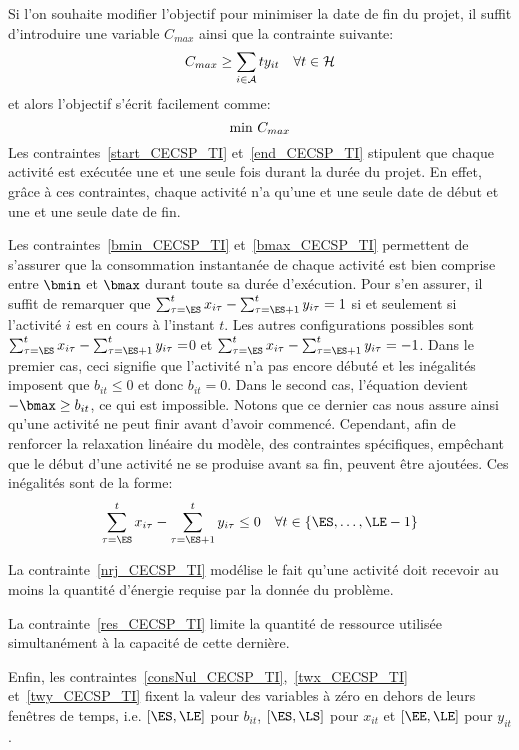 Si l'on souhaite modifier l'objectif pour minimiser la date de fin
du projet, il suffit d'introduire une variable $C_{max}$ ainsi que
la contrainte suivante: 
\begin{equation} 
C_{max} \ge \sum_{i \in {\cal A}} ty_{it} \quad \forall t \in {\cal H} \notag
\end{equation} 
et alors l'objectif s'écrit facilement comme: 
\begin{equation}
\text{min } C_{max} \notag
\end{equation} 
Les contraintes~\eqref{start_CECSP_TI} et~\eqref{end_CECSP_TI}
stipulent que chaque activité est exécutée une et une seule fois
durant la durée du projet. En effet, grâce à ces contraintes, chaque
activité n'a qu'une et une seule date de début et une et une seule
date de fin.

Les contraintes~\eqref{bmin_CECSP_TI} et~\eqref{bmax_CECSP_TI}
permettent de s'assurer que la consommation instantanée de chaque
activité est bien comprise entre $\bmin$ et $\bmax$ durant toute sa
durée d'exécution. Pour s'en assurer, il suffit de remarquer que
$\sum_{\tau=\ES}^{t} x_{i\tau} -\sum_{\tau=\ES+1}^{t}y_{i\tau}=1$ si
et seulement si l'activité $i$ est en cours à l'instant $t$. Les
autres configurations possibles sont $\sum_{\tau=\ES}^{t} x_{i\tau}
-\sum_{\tau=\ES+1}^{t} y_{i\tau}=$0 et $\sum_{\tau=\ES}^{t} x_{i\tau}
-\sum_{\tau=\ES+1}^{t} y_{i\tau}=-1$. Dans le premier cas, ceci
signifie que l'activité n'a pas encore débuté et les inégalités
imposent que $b_{it} \le 0$ et donc $b_{it}=0$. Dans le second cas,
l'équation devient $-\bmax \ge b_{it}$, ce qui est impossible. Notons
que ce dernier cas nous assure ainsi qu'une activité ne peut finir avant
d'avoir commencé. Cependant, afin de renforcer la relaxation linéaire
du modèle, des contraintes spécifiques, empêchant que le début d'une
activité ne se produise avant sa fin, peuvent être ajoutées. Ces
inégalités sont de la forme: 
\begin{equation}
 \sum_{\tau=\ES}^{t} x_{i\tau}
-\sum_{\tau=\ES+1}^{t} y_{i\tau} \le 0 \quad \forall t \in \{\ES,\dots,\LE-1\}
\end{equation}

La contrainte~\eqref{nrj_CECSP_TI} modélise le fait qu'une activité
doit recevoir au moins la quantité d'énergie requise par la donnée du
problème.

La contrainte~\eqref{res_CECSP_TI} limite la quantité de ressource
utilisée simultanément à la capacité de cette dernière.

Enfin, les contraintes~\eqref{consNul_CECSP_TI},~\eqref{twx_CECSP_TI}
et~\eqref{twy_CECSP_TI} fixent la valeur des variables à zéro en
dehors de leurs fenêtres de temps, i.e. $[\ES,\LE]$ pour $b_{it}$,
$[\ES,\LS]$ pour $x_{it}$ et $[\EE,\LE]$ pour $y_{it}$.

